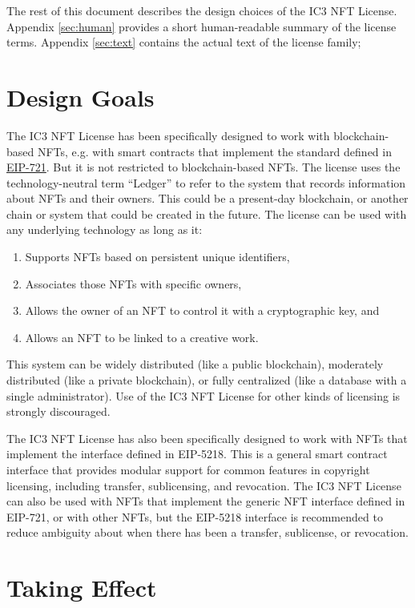 \documentclass{article}
\newcommand{\eiplicense}{EIP-5218\xspace}
\newcommand{\iccclicense}{IC3 NFT License\xspace}
\begin{document}
The rest of this document describes the design choices of the \iccclicense. Appendix \ref{sec:human} provides a short human-readable summary of the license terms. Appendix \ref{sec:text} contains the actual text of the license family; 


\section{Design Goals}


The \iccclicense has been specifically designed to work with blockchain-based NFTs, e.g. with smart contracts that implement the standard defined in \href{https://eips.ethereum.org/EIPS/eip-721}{EIP-721}. But it is not restricted to blockchain-based NFTs. The license uses the technology-neutral term ``Ledger'' to refer to the system that records information about NFTs and their owners. This could be a present-day blockchain, or another chain or system that could be created in the future. The license can be used with any underlying technology as long as it:
\begin{enumerate}
\item Supports NFTs based on persistent unique identifiers, 
\item Associates those NFTs with specific owners,
\item Allows the owner of an NFT to control it with a cryptographic key, and 
\item Allows an NFT to be linked to a creative work. 
\end{enumerate}
This system can be widely distributed (like a public blockchain), moderately distributed (like a private blockchain), or fully centralized (like a database with a single administrator). Use of the \iccclicense for other kinds of licensing is strongly discouraged.

The \iccclicense has also been specifically designed to work with NFTs that implement the interface defined in \eiplicense. This is a general smart contract interface that provides modular support for common features in copyright licensing, including transfer, sublicensing, and revocation. The \iccclicense can also be used with NFTs that implement the generic NFT interface defined in EIP-721, or with other NFTs, but the \eiplicense interface is recommended to reduce ambiguity about when there has been a transfer, sublicense, or revocation.


\section{Taking Effect}
\end{document}

